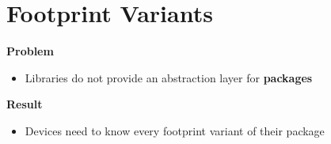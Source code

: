 \section{Footprint Variants}

\begin{frame}{\secname}
  \textbf{Problem}
  \begin{itemize}
    \item Libraries do not provide an abstraction layer for \textbf{packages}
  \end{itemize}

  \pause

  \textbf{Result}
  \begin{itemize}
    \item Devices need to know every footprint variant of their package
  \end{itemize}
\end{frame}


